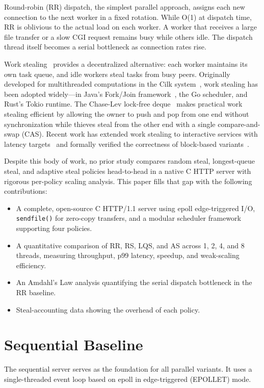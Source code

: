 \documentclass[conference]{IEEEtran}
\begin{document}
Round-robin (RR) dispatch, the simplest parallel approach, assigns each new connection to the next worker in a fixed rotation. While O(1) at dispatch time, RR is oblivious to the actual load on each worker. A worker that receives a large file transfer or a slow CGI request remains busy while others idle. The dispatch thread itself becomes a serial bottleneck as connection rates rise.

Work stealing~\cite{b1} provides a decentralized alternative: each worker maintains its own task queue, and idle workers steal tasks from busy peers. Originally developed for multithreaded computations in the Cilk system~\cite{b2}, work stealing has been adopted widely---in Java's Fork/Join framework~\cite{b20}, the Go scheduler, and Rust's Tokio runtime. The Chase-Lev lock-free deque~\cite{b3} makes practical work stealing efficient by allowing the owner to push and pop from one end without synchronization while thieves steal from the other end with a single compare-and-swap (CAS). Recent work has extended work stealing to interactive services with latency targets~\cite{b5} and formally verified the correctness of block-based variants~\cite{b4}.

Despite this body of work, no prior study compares random steal, longest-queue steal, and adaptive steal policies head-to-head in a native C HTTP server with rigorous per-policy scaling analysis. This paper fills that gap with the following contributions:

\begin{itemize}
\item A complete, open-source C HTTP/1.1 server using epoll edge-triggered I/O, \texttt{sendfile()} for zero-copy transfers, and a modular scheduler framework supporting four policies.
\item A quantitative comparison of RR, RS, LQS, and AS across 1, 2, 4, and 8 threads, measuring throughput, p99 latency, speedup, and weak-scaling efficiency.
\item An Amdahl's Law analysis quantifying the serial dispatch bottleneck in the RR baseline.
\item Steal-accounting data showing the overhead of each policy.
\end{itemize}

\section{Sequential Baseline}

The sequential server serves as the foundation for all parallel variants. It uses a single-threaded event loop based on epoll in edge-triggered (EPOLLET) mode.
\end{document}
